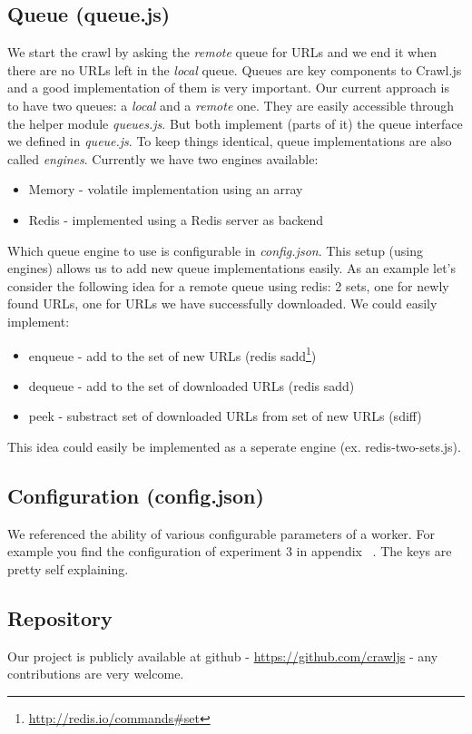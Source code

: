 \subsection{Queue (queue.js)}
We start the crawl by asking the \emph{remote} queue for URLs and we end it when there are no URLs left in the \emph{local} queue. Queues are key components to Crawl.js and a good implementation of them is very important. Our current approach is to have two queues: a \emph{local} and a \emph{remote} one. They are easily accessible through the helper module \emph{queues.js}. But both implement (parts of it) the queue interface we defined in \emph{queue.js}. To keep things identical, queue implementations are also called \emph{engines}. Currently we have two engines available:
\begin{itemize}
  \item Memory - volatile implementation using an array
  \item Redis - implemented using a Redis server as backend
\end{itemize}
Which queue engine to use is configurable in \emph{config.json}. This setup (using engines) allows us to add new queue implementations easily. As an example let's consider the following idea for a remote queue using redis: 2 sets, one for newly found URLs, one for URLs we have successfully downloaded. We could easily implement:
\begin{itemize}
  \item enqueue - add to the set of new URLs (redis sadd\footnote{\url{http://redis.io/commands\#set}})
  \item dequeue - add to the set of downloaded URLs (redis sadd)
  \item peek - substract set of downloaded URLs from set of new URLs (sdiff)
\end{itemize}
This idea could easily be implemented as a seperate engine (ex. redis-two-sets.js).

\subsection{Configuration (config.json)}
We referenced the ability of various configurable parameters of a worker. For example you find the configuration of experiment 3 in appendix ~. The keys are pretty self explaining.

\subsection{Repository}
Our project is publicly available at github - \url{https://github.com/crawljs} - any contributions are very welcome.
